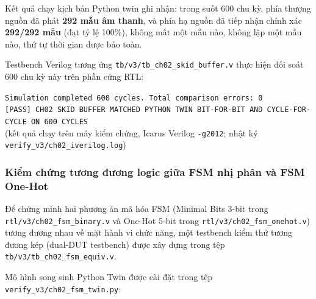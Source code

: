 Kết quả chạy kịch bản Python twin ghi nhận: trong suốt 600 chu kỳ, phía thượng nguồn đã phát \textbf{292 mẫu âm thanh}, và phía hạ nguồn đã tiếp nhận chính xác \textbf{292/292 mẫu} (đạt tỷ lệ 100\%), không mất một mẫu nào, không lặp một mẫu nào, thứ tự thời gian được bảo toàn.

Testbench Verilog tương ứng \texttt{tb/v3/tb\_ch02\_skid\_buffer.v} thực hiện đối soát 600 chu kỳ này trên phần cứng RTL:
\begin{center}
\small\texttt{Simulation completed 600 cycles. Total comparison errors: 0}\\
\small\texttt{[PASS] CH02 SKID BUFFER MATCHED PYTHON TWIN BIT-FOR-BIT AND CYCLE-FOR-CYCLE ON 600 CYCLES}\\
\footnotesize(kết quả chạy trên máy kiểm chứng, Icarus Verilog \texttt{-g2012}; nhật ký \texttt{verify\_v3/ch02\_iverilog.log})
\end{center}

\subsubsection*{Kiểm chứng tương đương logic giữa FSM nhị phân và FSM One-Hot}
Để chứng minh hai phương án mã hóa FSM (Minimal Bits 3-bit trong \texttt{rtl/v3/ch02\_fsm\_binary.v} và One-Hot 5-bit trong \texttt{rtl/v3/ch02\_fsm\_onehot.v}) tương đương nhau về mặt hành vi chức năng, một testbench kiểm thử tương đương kép (dual-DUT testbench) được xây dựng trong tệp\\ \texttt{tb/v3/tb\_ch02\_fsm\_equiv.v}.

Mô hình song sinh Python Twin được cài đặt trong tệp \texttt{verify\_v3/ch02\_fsm\_twin.py}:

